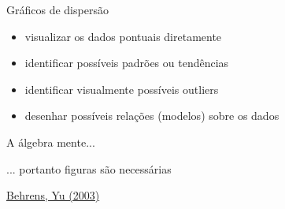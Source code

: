 \documentclass{beamer}
\begin{document}

\begin{frame}{Gráficos de dispersão}
  \begin{itemize}
    \footnotesize
  \item visualizar os dados pontuais diretamente
    \bigskip
  \item identificar possíveis padrões ou tendências
    \bigskip
  \item identificar visualmente possíveis outliers
    \bigskip
  \item desenhar possíveis relações (modelos) sobre os dados
  \end{itemize}
\end{frame}

\begin{frame}
  \begin{block}{}
    \begin{center}
      A álgebra mente...

      \bigskip
      ... portanto figuras são necessárias
    \end{center}
  \end{block}

  \vfill
  \tiny
  \hfill \href{https://doi.org/10.1002/0471264385.wei0202}
  {Behrens, Yu (2003)}
\end{frame}
\end{document}
